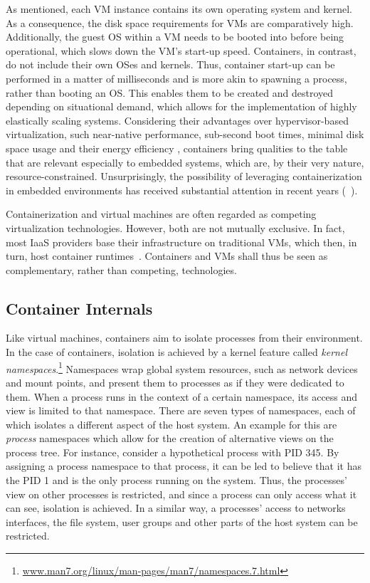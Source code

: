 As mentioned, each VM instance contains its own operating system and kernel. As a consequence, the disk space requirements for VMs are comparatively high. Additionally, the guest OS within a VM needs to be booted into before being operational, which slows down the VM's start-up speed. Containers, in contrast, do not include their own OSes and kernels. Thus, container start-up can be performed in a matter of milliseconds and is more akin to spawning a process, rather than booting an OS. This enables them to be created and destroyed depending on situational demand, which allows for the implementation of highly elastically scaling systems.
Considering their advantages over hypervisor-based virtualization, such near-native performance, sub-second boot times, minimal disk space usage and their energy efficiency \cite{morabito2015power}, containers bring qualities to the table that are relevant especially to embedded systems, which are, by their very nature, resource-constrained. Unsurprisingly, the possibility of leveraging containerization in embedded environments has received substantial attention in recent years (\eg\  \cite{bellavista2017feasibility, javed2016container, morabito2017virtualization}).

Containerization and virtual machines are often regarded as competing virtualization technologies. However, both are not mutually exclusive. In fact, most IaaS providers base their infrastructure on traditional VMs, which then, in turn, host container runtimes~\cite{dua2014virtualization}. Containers and VMs shall thus be seen as complementary, rather than competing, technologies.

\subsection{Container Internals}
Like virtual machines, containers aim to isolate processes from their environment. In the case of containers, isolation is achieved by a kernel feature called \emph{kernel namespaces}.\footnote{\url{www.man7.org/linux/man-pages/man7/namespaces.7.html}} Namespaces wrap global system resources, such as network devices and mount points, and present them to processes as if they were dedicated to them.
When a process runs in the context of a certain namespace, its access and view is limited to that namespace.
There are seven types of namespaces, each of which isolates a different aspect of the host system.
An example for this are \emph{process} namespaces which allow for the creation of alternative views on the process tree. For instance, consider a hypothetical process with PID 345. By assigning a process namespace to that process, it can be led to believe that it has the PID 1 and is the only process running on the system. Thus, the processes' view on other processes is restricted, and since a process can only access what it can see, isolation is achieved.
In a similar way, a processes' access to networks interfaces, the file system, user groups and other parts of the host system can be restricted.


